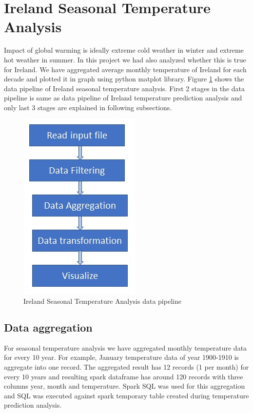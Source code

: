 \documentclass[journal,twoside,web]{ieeecolor}
\begin{document}
\section{Ireland Seasonal Temperature Analysis}
Impact of global warming is ideally extreme cold weather in winter and extreme hot weather in summer. In this project we had also analyzed whether this is true for Ireland. We have aggregated average monthly temperature of Ireland for each decade and plotted it in graph using python matplot library.  Figure \ref{ISTADP} shows the data pipeline of Ireland seasonal temperature analysis. First 2 stages in the data pipeline is same as data pipeline of Ireland temperature prediction analysis and only last 3 stages are explained in following subsections.

\begin{figure}[h]
\centering
\captionsetup{justification=centering}
\includegraphics[scale=.50]{Ireland_Seasonal_Temperature_Analysis_Pipeline.jpg}
\caption{Ireland Seasonal Temperature Analysis data pipeline}
\label{ISTADP}
\end{figure}

\subsection{Data aggregation}
For seasonal temperature analysis we have aggregated monthly temperature data for every 10 year. For example, January temperature data of year 1900-1910 is aggregate into one record.  The aggregated result has 12 records (1 per month) for every 10 years and resulting spark dataframe has around 120 records with three columns year, month and temperature.  Spark SQL was used for this aggregation and SQL was executed against spark temporary table created during temperature prediction analysis.
\end{document}
